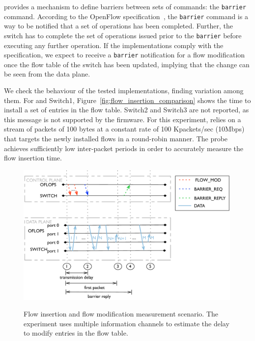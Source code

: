 \of provides a mechanism to define barriers between sets of commands: the
\texttt{barrier} command. According to the OpenFlow
specification~, the \texttt{barrier} command is a way to be
notified that a set of \of operations has been completed. Further, the switch
has to complete the set of operations issued prior to the \texttt{barrier}
before executing any further operation. If the \of implementations comply with
the specification, we expect to receive a \texttt{barrier} notification for a
flow modification once the flow table of the switch has been updated, implying
that the change can be seen from the data plane.

We check the behaviour of the tested \of implementations, finding variation among
them. For \ovs and Switch1, Figure~\ref{fig:flow_insertion_comparison} shows the
time to install a set of entries in the flow table. Switch2 and Switch3 are not
reported, as this \of message is not supported by the firmware.  For this
experiment, \oflops relies on a stream of packets of 100 bytes at a constant
rate of 100 Kpackets/sec (10Mbps) that targets the newly installed flows in a
round-robin manner. The probe achieves sufficiently low inter-packet periods in
order to accurately measure the flow insertion time.

\begin{figure}[h]
  \centering
    \includegraphics[width=0.99\textwidth]{Chapter1/Chapter1Figs/flow_insertion_seq_diagram} 
    \label{fig:flow_mod_scenario}
    \caption{Flow insertion and flow modification measurement scenario. The
      experiment uses multiple information channels to estimate the delay to
      modify entries in the flow table.}
\end{figure}

